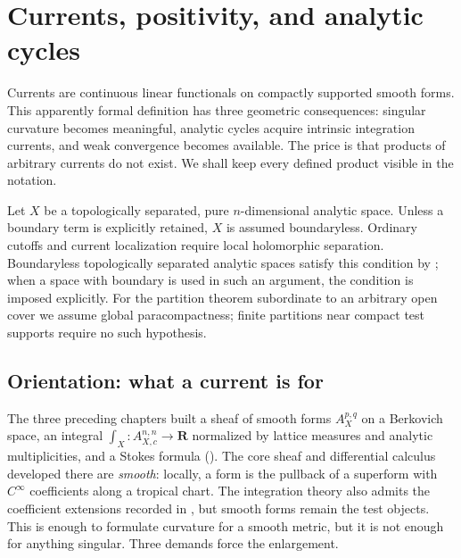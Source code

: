 \chapter{Currents, positivity, and analytic cycles}
\label{chap:cld-currents}

Currents are continuous linear functionals on compactly supported smooth
forms.  This apparently formal definition has three geometric consequences:
singular curvature becomes meaningful, analytic cycles acquire intrinsic
integration currents, and weak convergence becomes available.  The price is
that products of arbitrary currents do not exist.  We shall keep every
defined product visible in the notation.

Let $X$ be a topologically separated, pure $n$-dimensional analytic space.
Unless a boundary term is explicitly retained, $X$ is assumed boundaryless.
Ordinary cutoffs and current localization require local holomorphic
separation. Boundaryless topologically separated analytic spaces satisfy
this condition by \cite[paragraph~15.2.2]{CLD25}; when a space with boundary
is used in such an argument, the condition is imposed explicitly.
For the partition theorem subordinate to an arbitrary open cover we assume
global paracompactness; finite partitions near compact test supports require
no such hypothesis.

\section{Orientation: what a current is for}
\label{sec:ch14-orientation}

The three preceding chapters built a sheaf of smooth forms
$A_X^{p,q}$ on a Berkovich space, an integral
$\int_X:A_{X,c}^{n,n}\to\mathbf R$ normalized by lattice measures and
analytic multiplicities, and a Stokes formula
().  The core sheaf and differential
calculus developed there are \emph{smooth}: locally, a form is the pullback
of a superform with $C^\infty$ coefficients along a tropical chart.  The
integration theory also admits the coefficient extensions recorded in
, but smooth forms remain the test objects.  This is
enough to formulate curvature for a smooth metric, but it is not enough for
anything singular.  Three demands force the enlargement.

